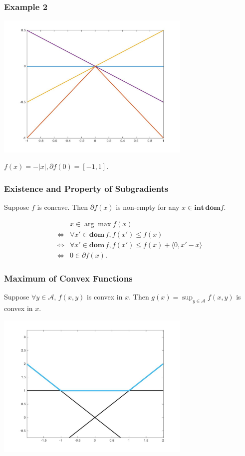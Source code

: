 \documentclass{beamer}
\begin{document}
\begin{frame}
    \frametitle{Example 2}
    \begin{center}
        \includegraphics[width=0.7\textwidth]{subgrad2.jpg}
    \end{center}
    \begin{center}
        $f(x)=-|x|,\partial f(0)=[-1,1]$.
    \end{center}
\end{frame}

\begin{frame}
    \frametitle{Existence and Property of Subgradients}
    Suppose $f$ is concave. Then $\partial f(x)$ is non-empty for any $x\in \mathbf{int}\,\mathbf{dom}f$.

    \begin{equation}
        \begin{array}{cl}
             & x\in\arg\max f(x) \\
            \iff & \forall x'\in \mathbf{dom}\,f,f(x')\le f(x) \\
            \iff & \forall x'\in \mathbf{dom}\,f,f(x')\le f(x)+\langle0,x'-x\rangle \\
            \iff & 0\in\partial f(x).
        \end{array}
    \end{equation}
\end{frame}

\begin{frame}
\frametitle{Maximum of Convex Functions}
Suppose $\forall y\in \mathcal{A}$, $f(x,y)$ is convex in $x$. Then $g(x)=\sup_{y\in \mathcal{A}}f(x,y)$ is convex in $x$.
\begin{center}
    \includegraphics[width=0.7\textwidth]{convexmax.jpg}
\end{center}
\end{frame}
\end{document}

